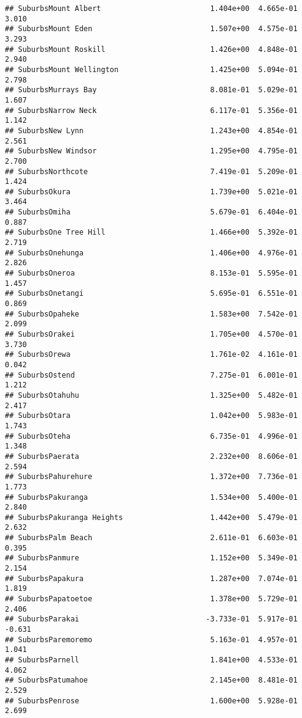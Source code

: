 \documentclass[
]{article}
\begin{document}
\begin{verbatim}
## SuburbsMount Albert                         1.404e+00  4.665e-01   3.010
## SuburbsMount Eden                           1.507e+00  4.575e-01   3.293
## SuburbsMount Roskill                        1.426e+00  4.848e-01   2.940
## SuburbsMount Wellington                     1.425e+00  5.094e-01   2.798
## SuburbsMurrays Bay                          8.081e-01  5.029e-01   1.607
## SuburbsNarrow Neck                          6.117e-01  5.356e-01   1.142
## SuburbsNew Lynn                             1.243e+00  4.854e-01   2.561
## SuburbsNew Windsor                          1.295e+00  4.795e-01   2.700
## SuburbsNorthcote                            7.419e-01  5.209e-01   1.424
## SuburbsOkura                                1.739e+00  5.021e-01   3.464
## SuburbsOmiha                                5.679e-01  6.404e-01   0.887
## SuburbsOne Tree Hill                        1.466e+00  5.392e-01   2.719
## SuburbsOnehunga                             1.406e+00  4.976e-01   2.826
## SuburbsOneroa                               8.153e-01  5.595e-01   1.457
## SuburbsOnetangi                             5.695e-01  6.551e-01   0.869
## SuburbsOpaheke                              1.583e+00  7.542e-01   2.099
## SuburbsOrakei                               1.705e+00  4.570e-01   3.730
## SuburbsOrewa                                1.761e-02  4.161e-01   0.042
## SuburbsOstend                               7.275e-01  6.001e-01   1.212
## SuburbsOtahuhu                              1.325e+00  5.482e-01   2.417
## SuburbsOtara                                1.042e+00  5.983e-01   1.743
## SuburbsOteha                                6.735e-01  4.996e-01   1.348
## SuburbsPaerata                              2.232e+00  8.606e-01   2.594
## SuburbsPahurehure                           1.372e+00  7.736e-01   1.773
## SuburbsPakuranga                            1.534e+00  5.400e-01   2.840
## SuburbsPakuranga Heights                    1.442e+00  5.479e-01   2.632
## SuburbsPalm Beach                           2.611e-01  6.603e-01   0.395
## SuburbsPanmure                              1.152e+00  5.349e-01   2.154
## SuburbsPapakura                             1.287e+00  7.074e-01   1.819
## SuburbsPapatoetoe                           1.378e+00  5.729e-01   2.406
## SuburbsParakai                             -3.733e-01  5.917e-01  -0.631
## SuburbsParemoremo                           5.163e-01  4.957e-01   1.041
## SuburbsParnell                              1.841e+00  4.533e-01   4.062
## SuburbsPatumahoe                            2.145e+00  8.481e-01   2.529
## SuburbsPenrose                              1.600e+00  5.928e-01   2.699

\end{verbatim}
\end{document}
